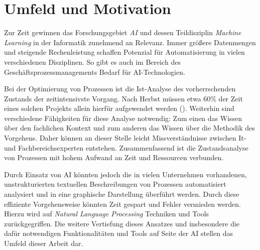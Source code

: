 \section{Umfeld und Motivation}

Zur Zeit gewinnen das Forschungsgebiet \textit{\ac{AI}} und dessen Teildisziplin \textit{Machine Learning} in der Informatik zunehmend an Relevanz. Immer größere Datenmengen und steigende Rechenleistung schaffen Potenzial für Automatisierung in vielen verschiedenen Disziplinen. So gibt es auch im Bereich des Geschäftsprozessmanagements Bedarf für AI-Technologien.\par
Bei der Optimierung von Prozessen ist die Ist-Analyse des vorherrschenden Zustands der zeitintensivste Vorgang. Nach Herbst müssen etwa 60\% der Zeit eines solchen Projekts allein hierfür aufgewendet werden (\cite[vgl.][1]{HERBST}). 
Weiterhin sind verschiedene Fähigkeiten für diese Analyse notwendig: Zum einen das Wissen über den fachlichen Kontext und zum anderen das Wissen über die Methodik des Vorgehens. Daher können an dieser Stelle leicht Missverständnisse zwischen It- und Fachbereichsexperten entstehen. Zusammenfassend ist die Zustandsanalyse von Prozessen mit hohem Aufwand an Zeit und Ressourcen verbunden.\par
Durch Einsatz von \ac{AI} könnten jedoch die in vielen Unternehmen vorhandenen, unstrukturierten textuellen Beschreibungen von Prozessen automatisiert analysiert und in eine graphische Darstellung überführt werden. Durch diese effiziente Vorgehensweise könnten Zeit gespart und Fehler vermieden werden. Hierzu wird auf \textit{Natural Language Processing} Techniken und Tools zurückgegriffen. Die weitere Vertiefung dieses Ansatzes und insbesondere die dafür notwendigen Funktionalitäten und Tools auf Seite der \ac{AI} stellen das Umfeld dieser Arbeit dar.

